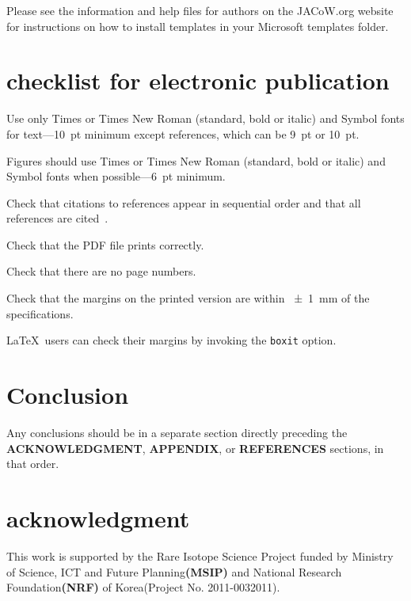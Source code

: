\documentclass[a4paper,
              ]{jacow}
\newcommand\SEC[1]{\textbf{\uppercase{#1}}}
\begin{document}
Please see the information and help files for authors on the JACoW.org website
for instructions  on  how to install templates in your Microsoft templates folder.

\section{checklist for electronic publication}

\begin{Itemize}
    \item  Use only Times or Times New Roman (standard, bold or italic) and Symbol
           fonts for text---\SI{10}{pt} minimum except references, which can be \SI{9}{pt} or \SI{10}{pt}.
    \item  Figures should use Times or Times New Roman (standard, bold or italic) and
           Symbol fonts when possible---\SI{6}{pt} minimum.
    \item  Check that citations to references appear in sequential order and
           that all references are cited~\cite{exampl-last}.
    \item  Check that the PDF file prints correctly.
    \item  Check that there are no page numbers.
    \item  Check that the margins on the printed version are within \SI{\pm1}{mm}
           of the specifications.
    \item  \LaTeX\ users can check their margins by invoking the
           \texttt{boxit} option.
\end{Itemize}

\section{Conclusion}

Any conclusions should be in a separate section directly preceding
the \SEC{Acknowledgment}, \SEC{Appendix}, or \SEC{References} sections, in that
order.

\section{acknowledgment}
This work is supported by the Rare Isotope Science Project funded by Ministry of Science, ICT and Future Planning\SEC{(MSIP)} and National Research Foundation\SEC{(NRF)} of Korea(Project No. 2011-0032011).

%
%
\iftrue   %
	\raggedend
\fi
\end{document}
